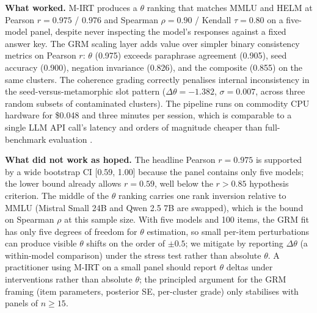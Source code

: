 \documentclass[11pt,letterpaper]{article}
\begin{document}
\textbf{What worked.} M-IRT produces a $\theta$ ranking that matches MMLU and HELM at Pearson $r = 0.975$ / $0.976$ and Spearman $\rho = 0.90$ / Kendall $\tau = 0.80$ on a five-model panel, despite never inspecting the model's responses against a fixed answer key. The GRM scaling layer adds value over simpler binary consistency metrics on Pearson $r$: $\theta$ (0.975) exceeds paraphrase agreement (0.905), seed accuracy (0.900), negation invariance (0.826), and the composite (0.855) on the same clusters. The coherence grading correctly penalises internal inconsistency in the seed-versus-metamorphic slot pattern ($\Delta\theta = -1.382$, $\sigma = 0.007$, across three random subsets of contaminated clusters). The pipeline runs on commodity CPU hardware for \$0.048 and three minutes per session, which is comparable to a single LLM API call's latency and orders of magnitude cheaper than full-benchmark evaluation \citep{Liang2022, Polo2024}.

\textbf{What did not work as hoped.} The headline Pearson $r = 0.975$ is supported by a wide bootstrap CI [0.59, 1.00] because the panel contains only five models; the lower bound already allows $r = 0.59$, well below the $r > 0.85$ hypothesis criterion. The middle of the $\theta$ ranking carries one rank inversion relative to MMLU (Mistral Small 24B and Qwen 2.5 7B are swapped), which is the bound on Spearman $\rho$ at this sample size. With five models and 100 items, the GRM fit has only five degrees of freedom for $\theta$ estimation, so small per-item perturbations can produce visible $\theta$ shifts on the order of $\pm 0.5$; we mitigate by reporting $\Delta\theta$ (a within-model comparison) under the stress test rather than absolute $\theta$. A practitioner using M-IRT on a small panel should report $\theta$ deltas under interventions rather than absolute $\theta$; the principled argument for the GRM framing (item parameters, posterior SE, per-cluster grade) only stabilises with panels of $n \geq 15$.
\end{document}
